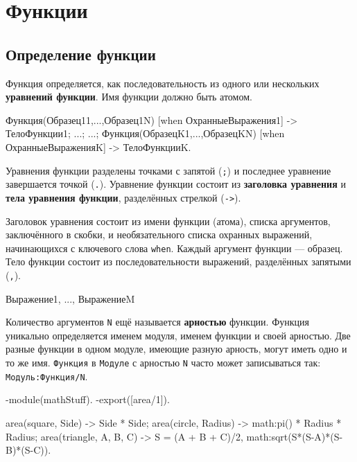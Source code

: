 \chapter{Функции}

\section{Определение функции}

Функция определяется, как последовательность из одного или нескольких  
\textbf{уравнений функции}. Имя функции должно быть атомом.

\vspace*{4pt}
\begin{erlangru}
Функция(Образец11,...,Образец1N)
  [when ОхранныеВыражения1] -> ТелоФункции1;
...;
...;
Функция(ОбразецK1,...,ОбразецKN)
  [when ОхранныеВыраженияK] -> ТелоФункцииK.
\end{erlangru}
\vspace*{4pt}

Уравнения функции разделены точками с запятой (\texttt{;}) и последнее уравнение
завершается точкой (\texttt{.}). Уравнение функции состоит из \textbf{заголовка
уравнения} и \textbf{тела уравнения функции}, разделённых стрелкой 
(\texttt{->}). 

Заголовок уравнения состоит из имени функции (атома), списка аргументов, 
заключённого в скобки, и необязательного списка охранных выражений, начинающихся
с ключевого слова \texttt{when}.  Каждый аргумент функции --- образец.  Тело 
функции состоит из последовательности выражений, разделённых запятыми (\texttt{,}).

\vspace*{4pt}
\begin{erlangru}
Выражение1,
...,
ВыражениеM
\end{erlangru}
\vspace*{4pt}

Количество аргументов \texttt{N} ещё называется \textbf{арностью} функции.
Функция уникально определяется именем модуля, именем функции и своей арностью. 
Две разные функции в одном модуле, имеющие разную арность, могут иметь одно и то
же имя.  \texttt{Функция} в \texttt{Модуле} с арностью \texttt{N} часто может
записываться так: \texttt{Модуль:Функция/N}.

\vspace*{4pt}
\begin{erlang}
-module(mathStuff).
-export([area/1]).

area({square, Side}) -> Side * Side;
area({circle, Radius}) -> math:pi() * Radius * Radius;
area({triangle, A, B, C}) ->
    S = (A + B + C)/2,
    math:sqrt(S*(S-A)*(S-B)*(S-C)).
\end{erlang}


